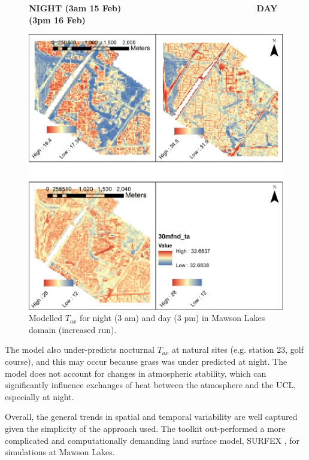 \documentclass[final,3p,times,authoryear]{elsarticle}
\begin{document}
\begin{figure}[!htbp]

\begin{center}
\textbf{{\Large NIGHT (3am 15 Feb)}} ~~~~~~~~~~~~~~~~~~~~~~~~~~~~~~~ \textbf{{\Large DAY (3pm 16 Feb)}}
\end{center}
\includegraphics[trim=0mm 92mm 0mm 0mm, clip,scale=1.05]{images/MawsonModelledTas.jpg}
 \caption{Modelled $T_{ax}$ for night (3 am) and day (3 pm) in Mawson Lakes domain (increased  run).} \label{fig:MawsonModelledTas}
\end{figure}


The model also under-predicts nocturnal $T_{ax}$ at natural sites (e.g. station 23, golf course), and this may occur because grass  was under predicted at night. The model does not account for changes in atmospheric stability, which can significantly influence exchanges of heat between the atmosphere and the UCL, especially at night.  

Overall, the general trends in spatial and temporal variability are well captured given the simplicity of the approach used. The toolkit out-performed a more complicated and computationally demanding land surface model, SURFEX \citep{Masson2013}, for  simulations at Mawson Lakes. 
\end{document}

